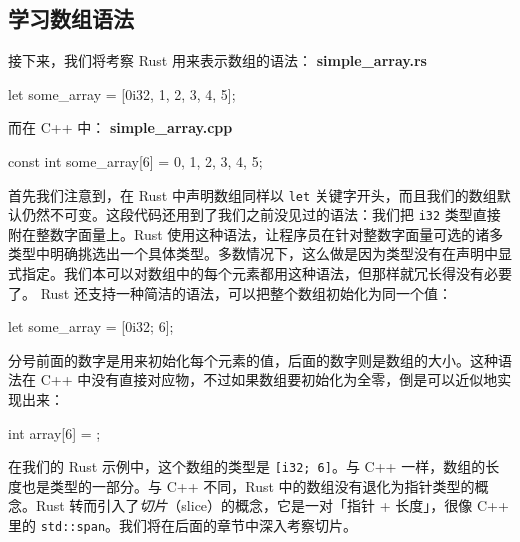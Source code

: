 \subsection{学习数组语法}
\label{idx:idx_da68a373}
接下来，我们将考察 Rust 用来表示数组的语法：
\textbf{simple\_\allowbreak{}array.\allowbreak{}rs}
\begin{codebox}[rust]
let some_array = [0i32, 1, 2, 3, 4, 5];
\end{codebox}
而在 C++ 中：
\textbf{simple\_\allowbreak{}array.\allowbreak{}cpp}
\begin{codebox}[rust]
const int some_array[6] = {0, 1, 2, 3, 4, 5};
\end{codebox}
首先我们注意到，在 Rust 中声明数组同样以 \texttt{let} 关键字开头，而且我们的数组默认仍然不可变。这段代码还用到了我们之前没见过的语法：我们把 \texttt{i32} 类型直接附在整数字面量上。Rust 使用这种语法，让程序员在针对整数字面量可选的诸多类型中明确挑选出一个具体类型。多数情况下，这么做是因为类型没有在声明中显式指定。我们本可以对数组中的每个元素都用这种语法，但那样就冗长得没有必要了。
Rust 还支持一种简洁的语法，可以把整个数组初始化为同一个值：
\begin{codebox}[rust]
let some_array = [0i32; 6];
\end{codebox}
分号前面的数字是用来初始化每个元素的值，后面的数字则是数组的大小。这种语法在 C++ 中没有直接对应物，不过如果数组要初始化为全零，倒是可以近似地实现出来：
\begin{codebox}[text]
int array[6] = {};
\end{codebox}
\label{idx:idx_5aa3234e}
在我们的 Rust 示例中，这个数组的类型是 \texttt{[i32; 6]}。与 C++ 一样，数组的长度也是类型的一部分。与 C++ 不同，Rust 中的数组没有退化为指针类型的概念。Rust 转而引入了\emph{切片}（slice）的概念，它是一对「指针 + 长度」，很像 C++ 里的 \texttt{std::span}。我们将在后面的章节中深入考察切片。
